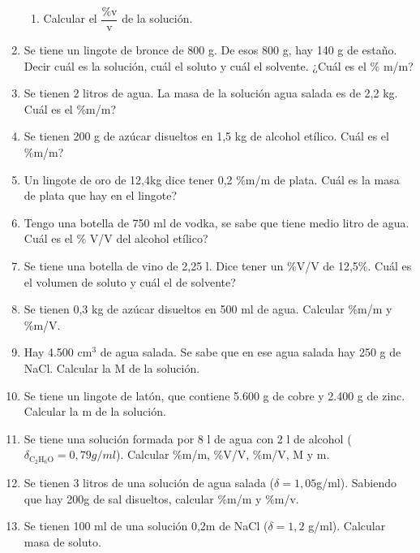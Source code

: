 \begin{enumerate}
\begin{enumerate}
    \item Calcular el $\dfrac{\%\text{v}}{\text{v}}$ de la solución.
\end{enumerate}


\item Se tiene un lingote de bronce de 800 g. De esos 800 g, hay 140 g de estaño. Decir cuál es la solución, cuál el soluto y cuál el solvente. ¿Cuál es el \% m/m? %

\item Se tienen 2 litros de agua. La masa de la solución agua salada es de 2,2 kg. Cuál es el \%m/m? %

\item Se tienen 200 g de azúcar disueltos en 1,5 kg de alcohol etílico. Cuál es el \%m/m? %

\item Un lingote de oro de 12,4kg dice tener 0,2 \%m/m de plata. Cuál es la masa de plata que hay en el lingote?

\item Tengo una botella de 750 ml de vodka, se sabe que tiene medio litro de agua. Cuál es el \% V/V del alcohol etílico?

\item Se tiene una botella de vino de 2,25 l. Dice tener un \%V/V de 12,5\%. Cuál es el volumen de soluto y cuál el de solvente?

\item Se tienen 0,3 kg de azúcar disueltos en 500 ml de agua. Calcular \%m/m y \%m/V.

\item Hay 4.500 cm$^3$ de agua salada. Se sabe que en ese agua salada hay 250 g de NaCl. Calcular la M de la solución. %

\item Se tiene un lingote de latón, que contiene 5.600 g de cobre y 2.400 g de zinc. Calcular la m de la solución. %

\item Se tiene una solución formada por 8 l de agua con 2 l de alcohol ($\delta_{\text{C}_2\text{H}_6\text{O}}=0,79 g/ml$). Calcular \%m/m, \linebreak
\%V/V, \%m/V, M y m.

\item Se tienen 3 litros de una solución de agua salada ($\delta = 1,05$g/ml). Sabiendo que hay 200g de sal disueltos, calcular \%m/m y \%m/v. %

\item Se tienen 100 ml de una solución 0,2m de NaCl ($\delta = 1,2$ g/ml). Calcular masa de soluto. %
\end{enumerate}

